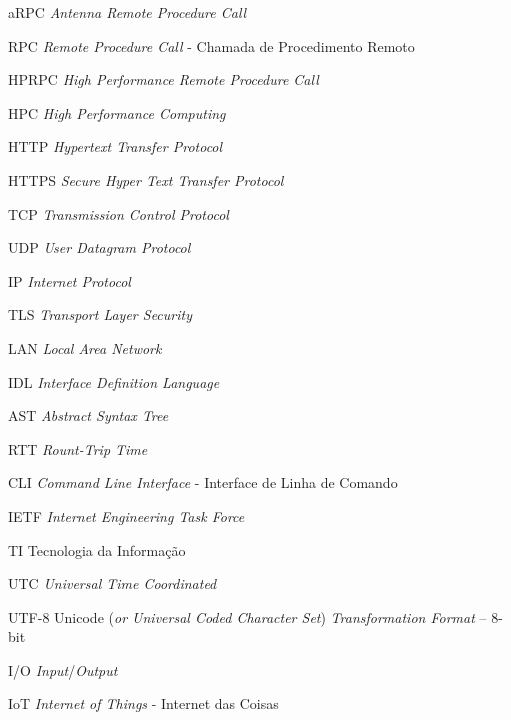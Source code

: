 \begin{siglas}

    \item [aRPC] \textit{Antenna Remote Procedure Call}
    \item [RPC] \textit{Remote Procedure Call} - Chamada de Procedimento Remoto
	\item [HPRPC] \textit{High Performance Remote Procedure Call}

    \item [HPC] \textit{High Performance Computing }

	\item [HTTP] \textit{Hypertext Transfer Protocol}
	\item [HTTPS] \textit{Secure Hyper Text Transfer Protocol}
	\item [TCP] \textit{Transmission Control Protocol}
	\item [UDP] \textit{User Datagram Protocol}
	\item [IP] \textit{Internet Protocol}
	\item [TLS] \textit{Transport Layer Security}
	\item [LAN] \textit{Local Area Network}

	\item [IDL] \textit{Interface Definition Language}
	\item [AST] \textit{Abstract Syntax Tree}
	\item [RTT] \textit{Rount-Trip Time}
	\item [CLI] \textit{Command Line Interface} - Interface de Linha de Comando

	\item [IETF] \textit{Internet Engineering Task Force}
	\item [TI] Tecnologia da Informação
	
	\item[UTC] \textit{Universal Time Coordinated}
	
	\item [UTF-8] Unicode (\textit{or Universal Coded Character Set}) \textit{Transformation Format} – 8-bit
	
	\item [I/O] \textit{Input}/\textit{Output}
	
	\item [IoT] \textit{Internet of Things} - Internet das Coisas
\end{siglas}
